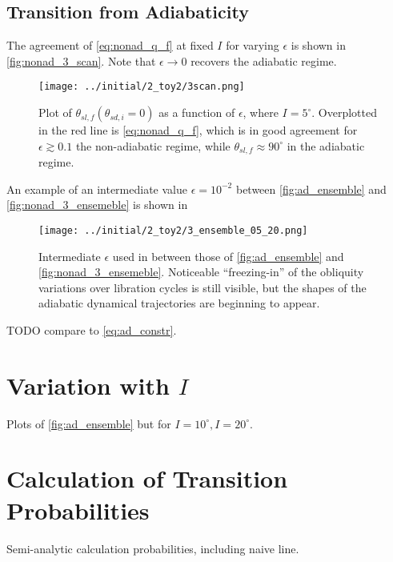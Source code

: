 \documentclass[
        fleqn,
        usenatbib,
    ]{mnras}
\newcommand*{\p}[1]{\left(#1\right)}
\begin{document}
\subsection{Transition from Adiabaticity}

The agreement of \autoref{eq:nonad_q_f} at fixed $I$ for varying $\epsilon$ is
shown in \autoref{fig:nonad_3_scan}. Note that $\epsilon \to 0$ recovers the
adiabatic regime.
\begin{figure}
    \centering
    \texttt{[image: ../initial/2\_toy2/3scan.png]}
    \caption{Plot of $\theta_{sl, f}\p{\theta_{sd, i} = 0}$ as a function of
    $\epsilon$, where $I = 5^\circ$. Overplotted in the red line is
    \autoref{eq:nonad_q_f}, which is in good agreement for $\epsilon \gtrsim
    0.1$ the non-adiabatic regime, while $\theta_{sl, f} \approx 90^\circ$ in
    the adiabatic regime.}\label{fig:nonad_3_scan}
\end{figure}

An example of an intermediate value $\epsilon = 10^{-2}$ between
\autoref{fig:ad_ensemble} and \autoref{fig:nonad_3_ensemeble} is shown in
\begin{figure}
    \centering
    \texttt{[image: ../initial/2\_toy2/3\_ensemble\_05\_20.png]}
    \caption{Intermediate $\epsilon$ used in between those of
    \autoref{fig:ad_ensemble} and \autoref{fig:nonad_3_ensemeble}. Noticeable
    ``freezing-in'' of the obliquity variations over libration cycles is still
    visible, but the shapes of the adiabatic dynamical trajectories are
    beginning to appear.}\label{fig:nonad_3_ensemble_20}
\end{figure}

TODO compare to \autoref{eq:ad_constr}.




\appendix

\section{Variation with $I$}

Plots of \autoref{fig:ad_ensemble} but for $I = 10^\circ, I=20^\circ$.

\section{Calculation of Transition Probabilities}\label{ss:app_transition}

Semi-analytic calculation probabilities, including naive line.

\label{lastpage} %
\end{document}

